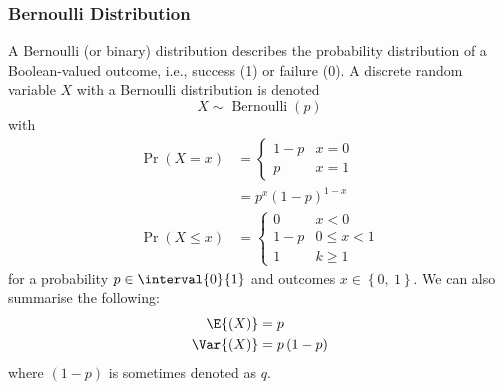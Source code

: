\documentclass{article}
\begin{document}
\subsubsection{Bernoulli Distribution}
A Bernoulli (or binary) distribution describes the probability
distribution of a Boolean-valued outcome, i.e., success (1) or failure
(0). A discrete random variable \(X\) with a Bernoulli distribution is
denoted
\begin{equation*}
    X \sim \operatorname{Bernoulli}{\left( p \right)}
\end{equation*}
with
\begin{align*}
    \Pr{\left( X = x \right)}    & =
    \begin{cases}
        1 - p & x = 0 \\
        p     & x = 1
    \end{cases}
    \\
                                 & = p^x \left( 1 - p \right)^{1 - x} \\
    \Pr{\left( X \leq x \right)} & =
    \begin{cases}
        0     & x < 0        \\
        1 - p & 0 \leq x < 1 \\
        1     & k \geq 1
    \end{cases}
\end{align*}
for a probability \(p \in \interval{0}{1}\) and outcomes \(x \in \left\{ 0,\: 1 \right\}\).
We can also summarise the following:
\begin{align*}
    \E{\left( X \right)}   & = p                      \\
    \Var{\left( X \right)} & = p \left( 1 - p \right)
\end{align*}
where \(\left( 1 - p \right)\) is sometimes denoted as \(q\).
\end{document}
